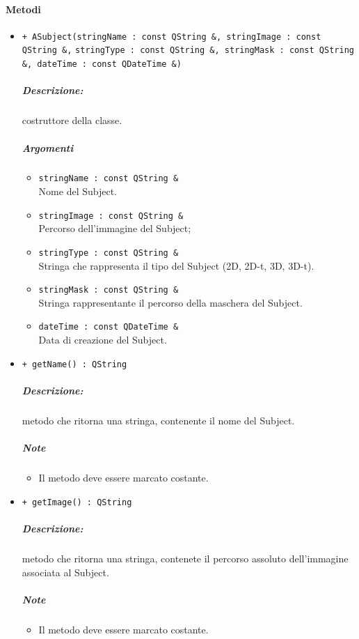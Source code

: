 \paragraph{\color{black}Metodi \\}
\begin{itemize}

			\item \color{blue} \verb!+ ASubject(stringName : const QString &, stringImage : const QString &,!
			\verb!stringType : const QString &, stringMask : const QString &, dateTime : const QDateTime &)!
			\color{black}
			\subparagraph{Descrizione:} costruttore della classe.
			\color{black}
			\subparagraph{Argomenti}
				\begin{itemize}
					\item \color{RoyalPurple} \verb!stringName : const QString &!\\				
								\color{black} Nome del Subject\g{}.
					\item \color{RoyalPurple} \verb!stringImage : const QString &!\\				
								\color{black} Percorso dell'immagine del Subject\g{};
					\item \color{RoyalPurple} \verb!stringType : const QString &!\\				
								\color{black} Stringa che rappresenta il tipo del Subject\g{} (2D, 2D-t, 3D, 3D-t).
					\item \color{RoyalPurple} \verb!stringMask : const QString &!\\				
							  \color{black} Stringa rappresentante il percorso della maschera del Subject\g{}.
					\item \color{RoyalPurple} \verb!dateTime : const QDateTime &!\\				
								\color{black} Data di creazione del Subject\g{}.
				\end{itemize}
			
			\item \color{blue} \verb!+ getName() : QString! 
			\color{black}
			\subparagraph{Descrizione:} metodo che ritorna una stringa, contenente il nome del Subject\g{}.
			\subparagraph{Note}
			\begin{itemize}
				\item Il metodo deve essere marcato costante.
			\end{itemize}
			
			\item \color{blue} \verb!+ getImage() : QString! 
			\color{black}
			\subparagraph{Descrizione:} metodo che ritorna una stringa, contenete il percorso assoluto dell'immagine associata al Subject\g{}.
			\subparagraph{Note}
			\begin{itemize}
				\item Il metodo deve essere marcato costante.
			\end{itemize}
			

\end{itemize}
